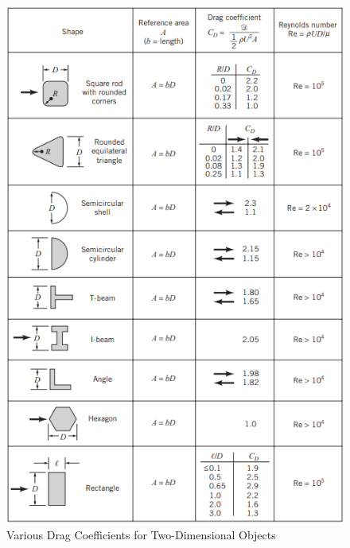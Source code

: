 \begin{figure}[H]
    \centering
    \includegraphics{7_Appendices/img/drag_coefficients.PNG}
    \caption{Various Drag Coefficients for Two-Dimensional Objects \cite{munson_fundamentals_2009}} 
    \label{fig:drag_coef}
\end{figure}

